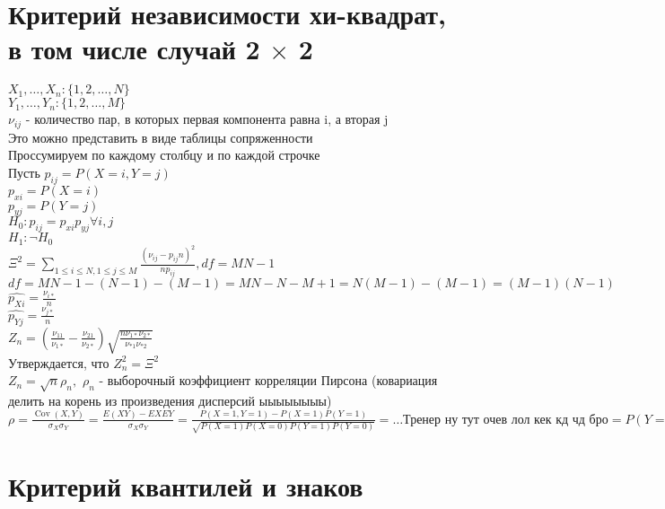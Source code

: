 \documentclass{article}
\newcommand\0{\mathbb{0}}
\DeclareMathOperator{\Cov}{Cov}
\newcommand\1{\mathbb{1}}
\begin{document}
\section{Критерий независимости хи-квадрат, в том числе случай 2 $\times$ 2}
$X_1, \dots, X_n: \{1, 2, \dots, N\}$\\
$Y_1, \dots, Y_n: \{1, 2, \dots, M\}$\\
$\nu_{ij}$ - количество пар, в которых первая компонента равна i, а вторая j\\
Это можно представить в виде таблицы  сопряженности\\
Проссумируем по каждому столбцу и по каждой строчке\\
Пусть $p_{ij} = P(X = i, Y = j)$\\
$p_{xi} = P(X = i)$\\
$p_{yj} = P(Y = j)$\\
$H_0: p_{ij} = p_{xi} p_{yj} \forall i, j$\\
$H_1: \neg H_0$\\
$\Xi^2 = \displaystyle\sum_{1 \leq i \leq N, 1 \leq j \leq M} \frac{(\nu_{ij} - p_{ij}n)^2}{np_{ij}}, df = MN - 1$\\
$df = MN - 1 - (N - 1) - (M - 1) = MN - N - M + 1 = N(M - 1) - (M - 1) = (M - 1)(N - 1)$\\
$\widehat{p_{Xi}} = \frac{\nu_{i*}}{n}$\\
$\widehat{p_{Yj}} = \frac{\nu_{j*}}{n}$\\
$Z_n = (\frac{\nu_{11}}{\nu_{1*}} - \frac{\nu_{21}}{\nu_{2*}})\sqrt{\frac{n\nu_{1*}\nu_{2*}}{\nu_{*1}\nu_{*2}}}$\\
Утверждается, что $Z_n^2 = \Xi^2$\\
$Z_n = \sqrt{n}\rho_n,$ $\rho_n$ - выборочный коэффициент корреляции Пирсона (ковариация делить на корень из произведения дисперсий ыыыыыыыы)\\
$\rho = \frac{\Cov(X, Y)}{\sigma_X \sigma_Y} = \frac{E(XY) - EXEY}{\sigma_X \sigma_Y} = \frac{P(X = 1, Y = 1) - P(X = 1)P(Y = 1)}{\sqrt{P(X = 1)P(X = 0)P(Y = 1)P(Y = 0)}} = \dots \text{Тренер ну тут очев лол кек кд чд бро} = P(Y = 1 | X = 1) - P(Y = 1 | X = 0)$
\section{Критерий квантилей и знаков}
\end{document}
